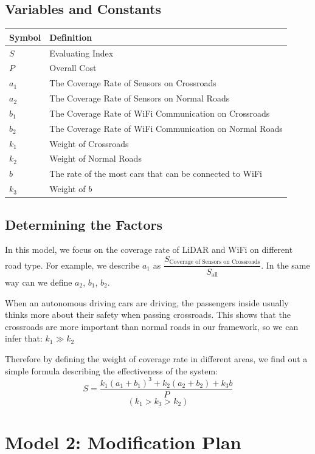 \documentclass[12pt]{article}
\theoremstyle{definition}
\theoremstyle{remark}
\numberwithin{equation}{section}
\begin{document}
		\subsection{Variables and Constants}
		\begin{tabular}{ll}
		\hline
		Symbol&Definition\\
		\hline
		$S$&Evaluating Index\\
		$P$&Overall Cost\\
		$a_1$&The Coverage Rate of Sensors on Crossroads\\
		$a_2$&The Coverage Rate of Sensors on Normal Roads\\
		$b_1$&The Coverage Rate of WiFi Communication on Crossroads\\
		$b_2$&The Coverage Rate of WiFi Communication on Normal Roads\\
		$k_1$&Weight of Crossroads\\
		$k_2$&Weight of Normal Roads\\
		$b$&The rate of the most cars that can be connected to WiFi\\
		$k_3$&Weight of $b$\\
		\hline
		\end{tabular}	
		\subsection{Determining the Factors}
		In this model, we focus on the coverage rate of LiDAR and WiFi on different road type. For example, we describe $a_1$ as $\dfrac{S_\text{Coverage of Sensors on Crossroads}}{S_\text{all}}$. In the same way can we define $a_2$, $b_1$, $b_2$.
		
		When an autonomous driving cars are driving, the passengers inside usually thinks more about their safety when passing crossroads. This shows that the crossroads are more important than normal roads in our framework, so we can infer that:
		$k_1 \gg k_2$
		
		Therefore by defining the weight of coverage rate in different areas, we find out a simple formula describing the effectiveness of the system:
		$$S=\dfrac{k_1(a_1+b_1)^3+k_2(a_2+b_2)+k_3b}{P}$$
		$$(k_1>k_3>k_2)$$
		
	
	\newpage
	\section{Model 2: Modification Plan}
\end{document}
